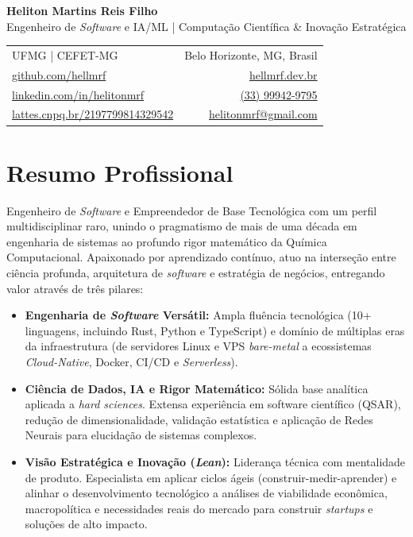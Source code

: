 \documentclass[10pt,a4paper]{article}
\begin{document}
{\Huge \textbf{Heliton Martins Reis Filho}}\\[0.3em]

{\large Engenheiro de \textit{Software} e IA/ML | Computação Científica \& Inovação Estratégica}\\[0.4em]

{\ttfamily
\begin{tabularx}{\textwidth}{@{}X r@{}}
UFMG | CEFET-MG & Belo Horizonte, MG, Brasil \\
\href{https://github.com/hellmrf}{github.com/hellmrf} & \href{https://hellmrf.dev.br}{hellmrf.dev.br} \\
\href{https://www.linkedin.com/in/helitonmrf/}{linkedin.com/in/helitonmrf} & \href{https://wa.me/5533999429795}{(33) 99942-9795} \\
\href{https://lattes.cnpq.br/2197799814329542}{lattes.cnpq.br/2197799814329542}& \href{mailto:helitonmrf@gmail.com}{helitonmrf@gmail.com} \\
\end{tabularx}
}

\section*{Resumo Profissional}
Engenheiro de \textit{Software} e Empreendedor de Base Tecnológica com um perfil multidisciplinar raro, unindo o pragmatismo de mais de uma década em engenharia de sistemas ao profundo rigor matemático da Química Computacional. Apaixonado por aprendizado contínuo, atuo na interseção entre ciência profunda, arquitetura de \textit{software} e estratégia de negócios, entregando valor através de três pilares:

\begin{itemize}[leftmargin=1.5em, itemsep=0.4em]
    \item \textbf{Engenharia de \textit{Software} Versátil:}
    Ampla fluência tecnológica (10+ linguagens, incluindo Rust, Python e TypeScript) e domínio de múltiplas eras da infraestrutura (de servidores Linux e VPS \textit{bare-metal} a ecossistemas \textit{Cloud-Native}, Docker, CI/CD e \textit{Serverless}).

    \item \textbf{Ciência de Dados, IA e Rigor Matemático:}
    Sólida base analítica aplicada a \textit{hard sciences}. Extensa experiência em software científico (QSAR), redução de dimensionalidade, validação estatística e aplicação de Redes Neurais para elucidação de sistemas complexos.

    \item \textbf{Visão Estratégica e Inovação (\textit{Lean}):}
    Liderança técnica com mentalidade de produto. Especialista em aplicar ciclos ágeis (construir-medir-aprender) e alinhar o desenvolvimento tecnológico a análises de viabilidade econômica, macropolítica e necessidades reais do mercado para construir \textit{startups} e soluções de alto impacto.
\end{itemize}
\end{document}
